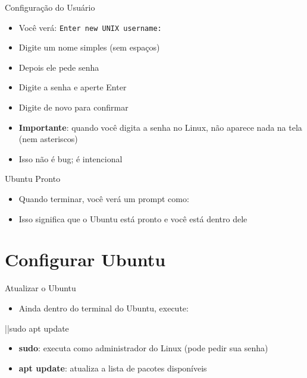 \begin{frame}{Configuração do Usuário}
\begin{itemize}
  \item Você verá: \texttt{Enter new UNIX username:}
  \item Digite um nome simples (sem espaços)
  \item Depois ele pede senha
  \item Digite a senha e aperte Enter
  \item Digite de novo para confirmar
  \item \textbf{Importante}: quando você digita a senha no Linux, não aparece nada na tela (nem asteriscos)
  \item Isso não é bug; é intencional
\end{itemize}
\end{frame}

\begin{frame}[fragile]{Ubuntu Pronto}
\begin{itemize}
  \item Quando terminar, você verá um prompt como:
\end{itemize}


\begin{itemize}
  \item Isso significa que o Ubuntu está pronto e você está dentro dele
\end{itemize}
\end{frame}

\section{Configurar Ubuntu}

\begin{frame}[fragile]{Atualizar o Ubuntu}
\begin{itemize}
  \item Ainda dentro do terminal do Ubuntu, execute:
\end{itemize}

\begin{bashprompt}
|\nocopy{\textdollar\ }|sudo apt update
\end{bashprompt}

\begin{itemize}
  \item \textbf{sudo}: executa como administrador do Linux (pode pedir sua senha)
  \item \textbf{apt update}: atualiza a lista de pacotes disponíveis
\end{itemize}
\end{frame}

